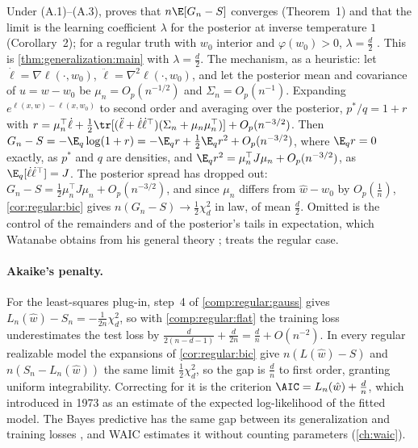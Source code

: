 \begin{refsection}
\begin{proofsketch}
Under (A.1)--(A.3), \textcite{Watanabe2010a} proves that $n\E[G_n-S]$ converges (Theorem~1) and that the limit is the learning coefficient $\lambda$ for the posterior at inverse temperature $1$ (Corollary~2); for a regular truth with $w_0$ interior and $\varphi(w_0)>0$, $\lambda=\frac d2$ \parencite[Lemma~3]{Watanabe2013}. This is \cref{thm:generalization:main} with $\lambda=\frac d2$. The mechanism, as a heuristic: let $\dot\ell=\nabla\ell(\cdot,w_0)$, $\ddot\ell=\nabla^2\ell(\cdot,w_0)$, and let the posterior mean and covariance of $u=w-w_0$ be $\mu_n=O_p(n^{-1/2})$ and $\Sigma_n=O_p(n^{-1})$. Expanding $e^{\ell(x,w)-\ell(x,w_0)}$ to second order and averaging over the posterior, $p^*/q=1+r$ with $r=\mu_n^\top\dot\ell+\frac12\tr[(\ddot\ell+\dot\ell\dot\ell^\top)(\Sigma_n+\mu_n\mu_n^\top)]+O_p(n^{-3/2})$. Then $G_n-S=-\E_q\log(1+r)=-\E_qr+\frac12\E_qr^2+O_p(n^{-3/2})$, where $\E_qr=0$ exactly, as $p^*$ and $q$ are densities, and $\E_qr^2=\mu_n^\top J\mu_n+O_p(n^{-3/2})$, as $\E_q[\dot\ell\dot\ell^\top]=J$. The posterior spread has dropped out: $G_n-S=\frac12\mu_n^\top J\mu_n+O_p(n^{-3/2})$, and since $\mu_n$ differs from $\hat w-w_0$ by $O_p(\frac1n)$, \cref{cor:regular:bic} gives $n(G_n-S)\to\frac12\chi^2_d$ in law, of mean $\frac d2$. Omitted is the control of the remainders and of the posterior's tails in expectation, which Watanabe obtains from his general theory \parencite[Chapter~6]{Watanabe2009}; \textcite[Chapter~4]{Watanabe2018} treats the regular case.
\end{proofsketch}

\paragraph{Akaike's penalty.} For the least-squares plug-in, step~4 of \cref{comp:regular:gauss} gives $L_n(\hat w)-S_n=-\frac1{2n}\chi^2_d$, so with \cref{comp:regular:flat} the training loss underestimates the test loss by $\frac d{2(n-d-1)}+\frac d{2n}=\frac dn+O(n^{-2})$. In every regular realizable model the expansions of \cref{cor:regular:bic} give $n(L(\hat w)-S)$ and $n(S_n-L_n(\hat w))$ the same limit $\frac12\chi^2_d$, so the gap is $\frac dn$ to first order, granting uniform integrability. Correcting for it is the criterion $\AIC=L_n(\hat w)+\frac dn$, which \textcite{Akaike1998} introduced in 1973 as an estimate of the expected log-likelihood of the fitted model. The Bayes predictive has the same gap between its generalization and training losses \parencite{Watanabe2010a}, and WAIC estimates it without counting parameters (\cref{ch:waic}).


\end{refsection}
